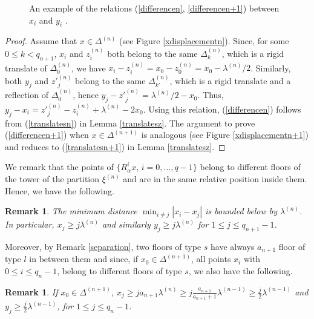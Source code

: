 \documentclass{conm-p-l}
\numberwithin{equation}{section}
\newtheorem{rem}[theorem]{Remark}
\begin{document}
\begin{figure}
\begin{center}
\end{center}
\begin{center}
\end{center}
\caption{\label{displacementfig}An example of the relations (\ref{differencen}, \ref{differencen+1}) between $x_i$ and $y_i$
.}
\end{figure}
\begin{proof}
Assume that ${x}\in \Delta^{(n)}$ (see Figure \ref{xdisplacementn}).
Since, for some $0\leq k < q_{n+1}$, $x_i$ and $z_i^{(n)}$ both belong to the same $\Delta^{(n)}_k$, which is a
rigid translate of $\Delta^{(n)}_0$, 
  we have $x_i - z_i^{(n)} = x_0 - z_0^{(n)} = x_0 -  \lambda^{(n)}/2$.
Similarly, both $y_{j}$ and ${z'}_{j}^{(n)}$ belong to the same
$\Delta^{(n)}_{k'}$, which is a rigid translate and a reflection of
$\Delta^{(n)}_0$, hence
 $y_{j} - {z'}_{j}^{(n)} =  \lambda^{(n)}/2 - x_0$. Thus,  $y_{j}-x_i =
{z'}_{j}^{(n)} -  z_{i}^{(n)} +   \lambda^{(n)} - 2 x_0$. Using this relation,
(\ref{differencen}) follows from (\ref{translatesn}) in Lemma \ref{translatesz}.
The argument to prove (\ref{differencen+1}) when ${x}\in \Delta^{(n+1)}$ is
analogous (see Figure \ref{xdisplacementn+1}) and reduces to (\ref{translatesn+1}) in Lemma \ref{translatesz}.
\end{proof}
We remark that the points of $\{R_{\alpha}^i {x}, \, i=0, \dots, q-1\}$
belong to  different floors of the tower of the partition  $\xi^{(n)}$ and are
in the same relative position inside them. 
Hence, we have the following.
\begin{rem}\label{minimumdistance}
The minimum distance $\min_{i\neq j} |x_i -x_j|$ is bounded below by
$\lambda^{(n)}$. In particular, $x_j \geq j\lambda^{(n)}$ and similarly $y_j \geq j\lambda^{(n)}$ for $1\leq j \leq q_{n+1}-1$. 
\end{rem}
Moreover,  by Remark \ref{separation}, two  floors of type $s$
have always $a_{n+1}$ floor of type $l$ in between them and since, if $x_0 \in \Delta^{(n+1)}$, all points $x_i$ with $0\leq i \leq q_{n}-1$, belong to different floors of type $s$, we also have the following.
\begin{rem}\label{minimumdistancesmall}
If $x_0\in \Delta^{(n+1)}$, $x_j \geq j a_{n+1}\lambda^{(n)} \geq j \frac{a_{n+1}}{a_{n+1}+1}\lambda^{(n-1)}\geq\frac{j}{2}\lambda^{(n-1)} $ and  $y_j \geq  \frac{j}{2}\lambda^{(n-1)}$, for  $1\leq j \leq q_{n}-1$.
\end{rem}
\end{document}
